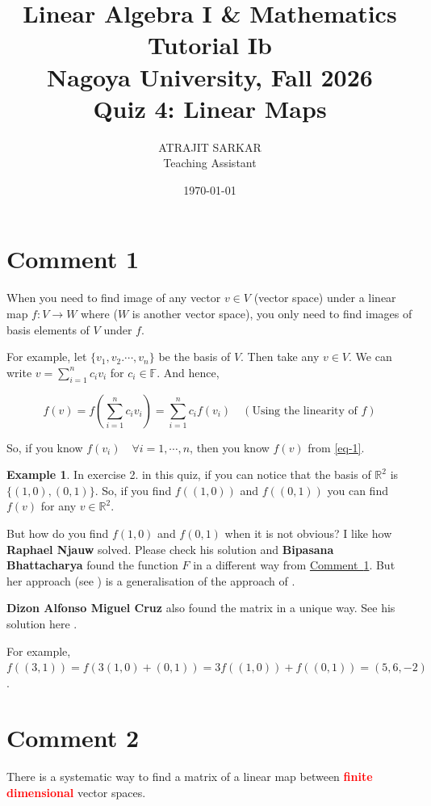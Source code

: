 \documentclass{article}
\title{\large Linear Algebra I \& Mathematics Tutorial Ib\\
\normalsize Nagoya University, Fall 2026\\[1.2em]
\LARGE Quiz 4: Linear Maps}
\author{ATRAJIT SARKAR\\ \small Teaching Assistant}
\date{\today}
\theoremstyle{definition}
\newtheorem{example}{Example}[section]
\begin{document}
\maketitle

\tableofcontents

\pagebreak

\section{Comment 1}\label{Comment1}

When you need to find image of any vector $v \in V$ (vector space) under a linear map $f:V \to W$  where ($W$ is another vector space), you only need to find images of basis elements of $V$ under $f$.

For example, let $\{v_1,v_2.\cdots, v_n\}$ be the basis of $V$. Then take any $v\in V$. We can write $v=\sum_{i=1}^n c_iv_i$ for $c_i \in \mathbb{F}$. And hence,

\begin{equation}\label{eq-1}
    f(v)=f\left(\sum_{i=1}^{n}c_iv_i\right)=\sum_{i=1}^{n}c_if(v_i)  \quad (\text{Using the linearity of }f) 
\end{equation}

So, if you know $f(v_i) \quad \forall i=1,\cdots, n$, then you know $f(v)$ from \eqref{eq-1}.

\begin{example}
    In exercise 2. in this quiz, if you can notice that the basis of $\mathbb{R}^2$ is $\{(1,0),(0,1)\}$. So, if you find $f((1,0))$ and $f((0,1))$ you can find $f(v)$ for any $v\in \mathbb{R}^2$. 

    \begin{highlightbox}
    But how do you find $f(1,0)$ and $f(0,1)$ when it is not obvious? I like how \textbf{Raphael Njauw} solved. Please check his solution \cite{RN} and \textbf{Bipasana Bhattacharya} found the function $F$ in a different way from \hyperref[Comment1]{Comment~\ref*{Comment1}}. But her approach (see \cite{BB}) is a generalisation of the approach of \cite{RN}. 

    \textbf{Dizon Alfonso Miguel Cruz} also found the matrix in a unique way. See his solution here \cite{DAMC}. 
    \end{highlightbox}

    For example, $f((3,1))=f(3(1,0)+(0,1))=3f((1,0))+f((0,1))=(5,6,-2)$. 
\end{example}

\section{Comment 2}
There is a systematic way to find a matrix of a linear map between \textcolor{red}{\textbf{finite dimensional}} vector spaces.
\end{document}
